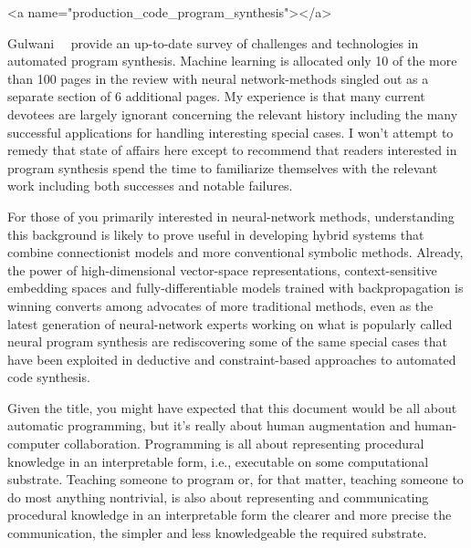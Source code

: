 
\rawhtml
<a name="production_code_program_synthesis"></a>
\endrawhtml
{}


Gulwani~\etal{}~\cite{GulwanietalFaTiPL-17} provide an up-to-date survey of challenges and technologies in automated program synthesis. Machine learning is allocated only 10 of the more than 100 pages in the review with neural network-methods singled out as a separate section of 6 additional pages. My experience is that many current devotees are largely ignorant concerning the relevant history including the many successful applications for handling interesting special cases. I won't attempt to remedy that state of affairs here except to recommend that readers interested in program synthesis spend the time to familiarize themselves with the relevant work including both successes and notable failures. 

For those of you primarily interested in neural-network methods, understanding this background is likely to prove useful in developing hybrid systems that combine connectionist models and more conventional symbolic methods. Already, the power of high-dimensional vector-space representations, context-sensitive embedding spaces and fully-differentiable models trained with backpropagation is winning converts among advocates of more traditional methods, even as the latest generation of neural-network experts working on what is popularly called neural program synthesis are rediscovering some of the same special cases that have been exploited in deductive and constraint-based approaches to automated code synthesis.


Given the title, you might have expected that this document would be all about automatic programming, but it's really about human augmentation and human-computer collaboration. Programming is all about representing procedural knowledge in an interpretable form, i.e., executable on some computational substrate. Teaching someone to program or, for that matter, teaching someone to do most anything nontrivial, is also about representing and communicating procedural knowledge in an interpretable form \emdash{} the clearer and more precise the communication, the simpler and less knowledgeable the required substrate.

